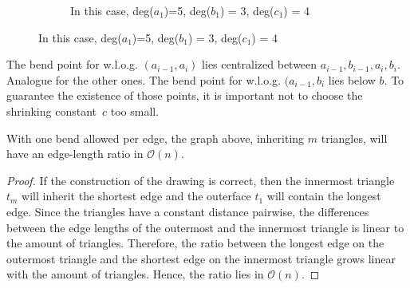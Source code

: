 \begin{enumerate}
\begin{figure}[H]
\begin{subfigure}{0.8\textwidth}
			\caption{In this case, deg($a_1$)=5, deg($b_1$) = 3, deg($c_1$) = 4}
		\end{subfigure}

	\end{figure}
	The bend point for w.l.o.g. $(a_{i-1},a_i)$ lies centralized between $a_{i-1}, b_{i-1},a_i, b_i$. Analogue for the other ones. The bend point for w.l.o.g. $(a_{i-1},b_i$ lies below $b$. To guarantee the existence of those points, it is important not to choose the \grqq shrinking constant\grqq~$c$ too small.
\end{enumerate}
	\begin{lemma}
		With one bend allowed per edge, the graph above, inheriting $m$ triangles, will have an edge-length ratio in $\mathcal{O}(n)$.
	\end{lemma}
	\begin{proof}
		If the construction of the drawing is correct, then the innermost triangle $t_m$ will inherit the shortest edge and the outerface $t_1$ will contain the longest edge. Since the triangles have a constant distance pairwise, the differences between the edge lengths of the outermost and the innermost triangle is linear to the amount of triangles. Therefore, the ratio between the longest edge on the outermost triangle and the shortest edge on the innermost triangle grows linear with the amount of triangles. Hence, the ratio lies in $\mathcal{O}(n)$.
	\end{proof}
